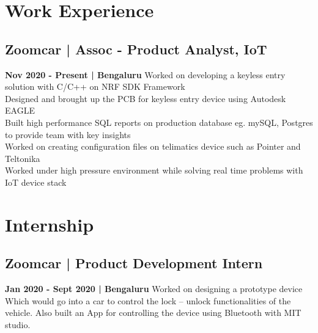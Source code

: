 \documentclass[]{Abhijoshi}
\begin{document}
\begin{minipage}[t]{0.47\textwidth} 
\hspace{4mm}

\section{Work Experience}
\vspace{2mm}
\subsection{Zoomcar | A\MakeLowercase{ssoc} - P\MakeLowercase{roduct} A\MakeLowercase{nalyst}, I\MakeLowercase{o}T}

\vspace{0.5mm}
\large \textbf{Nov 2020 - Present | Bengaluru} 
\vspace{0.5mm}
\newline
\textbullet{} Worked on developing a keyless entry solution with C/C++ on NRF SDK Framework\\
\textbullet{} Designed and brought up the PCB for keyless entry device using Autodesk EAGLE \\
\textbullet{} Built high performance SQL reports on production database eg. mySQL, Postgres to provide team with key insights\\
\textbullet{} Worked on creating configuration files on telimatics device such as Pointer and Teltonika\\
\textbullet{} Worked under high pressure environment while solving real time problems with IoT device stack

\sectionsep

\section{Internship}
\vspace{2mm}
\subsection{Zoomcar | P\MakeLowercase{roduct} D\MakeLowercase{evelopment} I\MakeLowercase{ntern}}
\vspace{0.5mm}
\large \textbf{Jan 2020 - Sept 2020 | Bengaluru} 
\vspace{0.5mm}
\newline
Worked on designing a prototype device
Which would go into a car to control the lock –
unlock functionalities of the vehicle. Also built an
App for controlling the device using Bluetooth with MIT studio.


\end{minipage}
\end{document}

